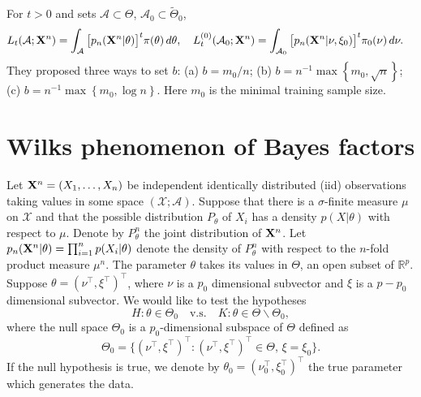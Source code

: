 \documentclass[11pt]{article}
\theoremstyle{plain}
\theoremstyle{definition}
\theoremstyle{remark}
\begin{document}
For $t>0$ and sets $\mathcal A\subset \Theta$, $\mathcal A_0\subset \tilde{\Theta}_0$,
\begin{align*}
 &L_t(\mathcal A;\mathbf{X}^{n})=\int_{\mathcal A}\big[p_n(\mathbf{X}^{n}|\theta)\big]^t \pi(\theta)\, d\theta,
\quad
 L_t^{(0)}(\mathcal A_0;\mathbf{X}^{n})=\int_{\mathcal A_0}\big[p_n(\mathbf{X}^{n}|\nu,\xi_0)\big]^t \pi_0(\nu)\, d\nu.
\end{align*}
They proposed three ways to set $b$: (a) $b=m_0/n$; (b) $b= n^{-1}\max \left\{ m_0, \sqrt n \right\}$; (c) $b=n^{-1} \max\left\{ m_0, \log n \right\}$.
Here $m_0$ is the minimal training sample size.


\section{Wilks phenomenon of Bayes factors}


Let $\mathbf{X}^{n}=(X_1,\ldots,X_n)$ be independent identically distributed (iid) observations taking values in some space $(\mathcal{X};\mathscr{A})$.
Suppose that there is a $\sigma$-finite measure $\mu$ on $\mathcal{X}$ and that the  possible distribution $P_\theta$ of $X_i$ has a density $p(X|\theta)$ with respect to $\mu$.
Denote by $P_{\theta}^{n}$ the joint distribution of $\mathbf{X}^{n}$.
Let $p_{n}(\mathbf{X}^{n}|\theta)=\prod_{i=1}^n p(X_i|\theta)$ denote the density of $P_{\theta}^n$ with respect to the $n$-fold product measure $\mu^n$.
The parameter $\theta$ takes its values in $\Theta$, an open subset of $\mathbb{R}^{p}$.
Suppose $\theta=(\nu^\top ,\xi^\top )^\top $, where $\nu$ is a $p_0$ dimensional subvector and $\xi$ is a $p-p_0$ dimensional subvector.
 We would like to test the hypotheses
\begin{equation*}
    H:\theta\in\Theta_0\quad \text{v.s.}\quad K:\theta\in\Theta\backslash \Theta_0,
\end{equation*}
where the null space $\Theta_0$ is a $p_0$-dimensional subspace of $\Theta$ defined as
\begin{equation*}
    \Theta_0=\{(\nu^\top ,\xi^\top )^\top :(\nu^\top ,\xi^\top )^\top \in\Theta, \, \xi=\xi_0\}.
\end{equation*}
If the null hypothesis is true, we denote by $\theta_0=(\nu_0^\top ,\xi_0^\top )^\top $ the true parameter which generates the data.
\end{document}
